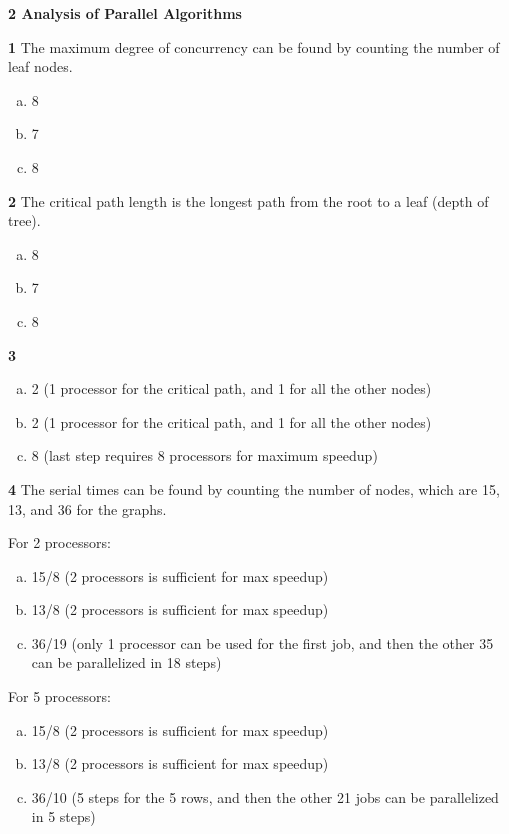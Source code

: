 \documentclass[11pt]{article}
\newcommand{\problem}{\FloatBarrier \medskip \noindent \textbf}
\begin{document}
 \medskip

\vspace{0.2in}

\problem{2 Analysis of Parallel Algorithms}

\problem{1}
The maximum degree of concurrency can be found by counting the number of leaf nodes.

\begin{enumerate}[a)]
\item 8
\item 7
\item 8
\end{enumerate}

\problem{2}
The critical path length is the longest path from the root to a leaf (depth of tree).

\begin{enumerate}[a)]
\item 8
\item 7
\item 8
\end{enumerate}

\problem{3}
\begin{enumerate}[a)]
\item 2 (1 processor for the critical path, and 1 for all the other nodes)
\item 2 (1 processor for the critical path, and 1 for all the other nodes)
\item 8 (last step requires 8 processors for maximum speedup)
\end{enumerate}

\problem{4}
The serial times can be found by counting the number of nodes, which are 15, 13, and 36 for the graphs.

For 2 processors:
\begin{enumerate}[a)]
\item 15/8 (2 processors is sufficient for max speedup)
\item 13/8 (2 processors is sufficient for max speedup)
\item 36/19 (only 1 processor can be used for the first job, and then the other 35 can be parallelized in 18 steps)
\end{enumerate}

For 5 processors:
\begin{enumerate}[a)]
\item 15/8 (2 processors is sufficient for max speedup)
\item 13/8 (2 processors is sufficient for max speedup)
\item 36/10 (5 steps for the 5 rows, and then the other 21 jobs can be parallelized in 5 steps)
\end{enumerate}
\end{document}
